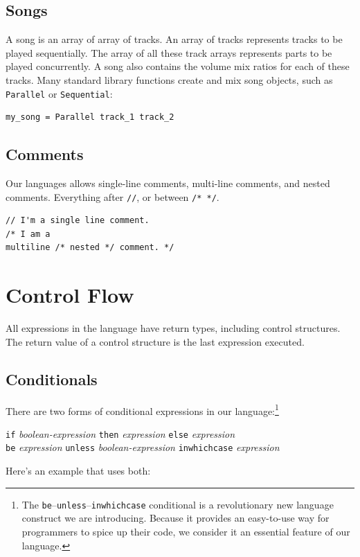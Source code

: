 \documentclass[11pt, onecolumn, letterpaper]{article}
\begin{document}
\subsection{Songs}
A song is an array of array of tracks. An array of tracks represents tracks to be played sequentially. The array of all these track arrays represents parts to be played concurrently. A song also contains the volume mix ratios for each of these tracks. Many standard library functions create and mix song objects, such as \texttt{Parallel} or \texttt{Sequential}:
\begin{lstlisting}
my_song = Parallel track_1 track_2
\end{lstlisting}

\subsection{Comments}
Our languages allows single-line comments, multi-line comments, and nested comments. Everything after \texttt{//}, or between \texttt{/* */}.

\begin{lstlisting}
// I'm a single line comment.
/* I am a 
multiline /* nested */ comment. */
\end{lstlisting}
 
\section{Control Flow}
All expressions in the language have return types, including control structures. The return value of a control structure is the last expression executed.

\subsection{Conditionals}
There are two forms of conditional expressions in our language:\footnote{The \texttt{be}--\texttt{unless}--\texttt{inwhichcase} conditional is a revolutionary new language construct we are introducing. Because it provides an easy-to-use way for programmers to spice up their code, we consider it an essential feature of our language.}

\texttt{if} \textit{boolean-expression} \texttt{then} \textit{expression} \texttt{else} \textit{expression} \\
\texttt{be} \textit{expression} \texttt{unless} \textit{boolean-expression} \texttt{inwhichcase} \textit{expression}

Here's an example that uses both:
\end{document}
